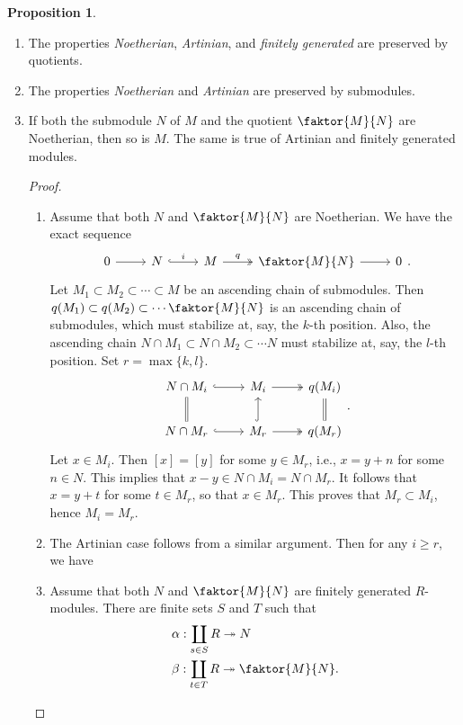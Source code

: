 \documentclass[10pt,letterpaper,cm]{nupset}
\theoremstyle{definition}
\theoremstyle{theorem}
\newtheorem{prop}[definition]{Proposition}
\theoremstyle{remark}
\newcommand{\1}{\mathbf{1}}
\newcommand{\0}{\vec 0}
\begin{document}
\begin{prop} $ $
\begin{enumerate}
\item The properties \textit{Noetherian}, \textit{Artinian}, and \textit{finitely generated} are preserved by quotients. 
\item The properties \textit{Noetherian} and \textit{Artinian} are preserved by submodules.
\item If both the submodule $N$ of $M$ and the quotient $\faktor{M}{N}$ are Noetherian, then so is $M$. The same is true of Artinian and finitely generated modules.
\begin{proof} $ $
\begin{enumerate} 
\item Assume that both $N$ and $\faktor{M}{N}$ are Noetherian. We have the exact sequence
\[
\begin{tikzcd}
0 \arrow[r] & N \arrow[r, "i", hook] & M \arrow[r, "q", two heads] & \faktor{M}{N} \arrow[r] & 0
\end{tikzcd}.
\] Let $M_1 \subset M_2 \subset \cdots \subset M$ be an ascending chain of submodules.  Then $q(M_1) \subset q(M_2) \subset \cdots \faktor{M}{N}$ is an ascending chain of submodules, which must stabilize at, say, the $k$-th position. Also, the ascending chain $N \cap M_1 \subset N \cap M_2 \subset \cdots N$ must stabilize at, say, the $l$-th position. Set $ r= \max\{k, l\}$.
\[
\begin{tikzcd}
N \cap M_i \arrow[r, hook] & M_i \arrow[r, two heads] & q(M_i) \\
N \cap M_r \arrow[u, equal] \arrow[r, hook] & M_r \arrow[u, hook] \arrow[r, two heads] & q(M_r) \arrow[u, equal]
\end{tikzcd}.
\]
Let $x \in M_i$. Then $[x] = [y]$ for some $y\in M_r$, i.e., $x = y+n$ for some $n\in N$. This implies that $x-y \in N \cap M_i = N \cap M_r$. It follows that $x = y+t$ for some $t\in M_r$, so that $x\in M_r$. This proves that $M_r\subset M_i$, hence $M_i = M_r$.
\item The Artinian case follows from a similar argument. Then for any $i\geq r$, we have
\item Assume that both $N$ and $\faktor{M}{N}$ are finitely generated $R$-modules. There are finite sets $S$ and $T$ such that
\begin{align*}
& \alpha: \coprod_{s\in S}R \twoheadrightarrow N  \\
& \beta : \coprod_{t\in T} R \twoheadrightarrow \faktor{M}{N}.
\end{align*}

\end{enumerate}
\end{proof}
\end{enumerate}
\end{prop}
\end{document}
